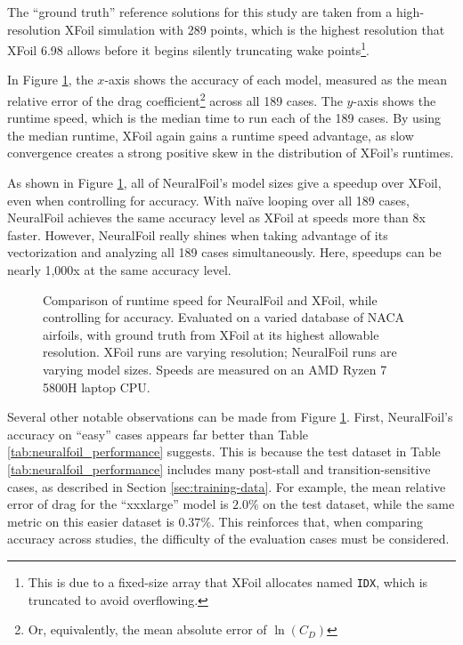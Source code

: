 \documentclass[journal]{new-aiaa}
\begin{document}
The ``ground truth'' reference solutions for this study are taken from a high-resolution XFoil simulation with 289 points, which is the highest resolution that XFoil 6.98 allows before it begins silently truncating wake points\footnote{This is due to a fixed-size array that XFoil allocates named \texttt{IDX}, which is truncated to avoid overflowing.}.

In Figure \ref{fig:accuracy_speed}, the $x$-axis shows the accuracy of each model, measured as the mean relative error of the drag coefficient\footnote{Or, equivalently, the mean absolute error of $\ln(C_D)$} across all 189 cases. The $y$-axis shows the runtime speed, which is the median time to run each of the 189 cases. By using the median runtime, XFoil again gains a runtime speed advantage, as slow convergence creates a strong positive skew in the distribution of XFoil's runtimes.

As shown in Figure \ref{fig:accuracy_speed}, all of NeuralFoil's model sizes give a speedup over XFoil, even when controlling for accuracy. With naïve looping over all 189 cases, NeuralFoil achieves the same accuracy level as XFoil at speeds more than 8x faster. However, NeuralFoil really shines when taking advantage of its vectorization and analyzing all 189 cases simultaneously. Here, speedups can be nearly 1,000x at the same accuracy level.

\begin{figure}[H]
    \centering
    
    \caption{Comparison of runtime speed for NeuralFoil and XFoil, while controlling for accuracy. Evaluated on a varied database of NACA airfoils, with ground truth from XFoil at its highest allowable resolution. XFoil runs are varying resolution; NeuralFoil runs are varying model sizes. Speeds are measured on an AMD Ryzen 7 5800H laptop CPU.}
    \label{fig:accuracy_speed}
\end{figure}

Several other notable observations can be made from Figure \ref{fig:accuracy_speed}. First, NeuralFoil's accuracy on ``easy'' cases appears far better than Table \ref{tab:neuralfoil_performance} suggests. This is because the test dataset in Table \ref{tab:neuralfoil_performance} includes many post-stall and transition-sensitive cases, as described in Section \ref{sec:training-data}. For example, the mean relative error of drag for the ``xxxlarge'' model is $2.0\%$ on the test dataset, while the same metric on this easier dataset is $0.37\%$. This reinforces that, when comparing accuracy across studies, the difficulty of the evaluation cases must be considered.
\end{document}
